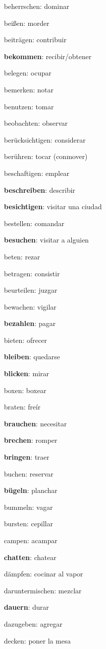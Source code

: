 \begin{multicols}{2}
\begin{myitemize}
\item beherrschen: dominar
\item beißen: morder
\item beiträgen: contribuir
\item \textbf{bekommen}: recibir/obtener
\item belegen: ocupar
\item bemerken: notar
\item benutzen: tomar
\item beobachten: observar
\item berücksichtigen: considerar
\item berühren: tocar (conmover)
\item beschaftigen: emplear
\item \textbf{beschreiben}: describir
\item \textbf{besichtigen}: visitar una ciudad
\item bestellen: comandar
\item \textbf{besuchen}: visitar a alguien
\item beten: rezar
\item betragen: consistir
\item beurteilen: juzgar
\item bewachen: vigilar
\item \textbf{bezahlen}: pagar
\item bieten: ofrecer
\item \textbf{bleiben}: quedarse
\item \textbf{blicken}: mirar
\item boxen: boxear
\item braten: freír
\item \textbf{brauchen}: necesitar
\item \textbf{brechen}: romper
\item \textbf{bringen}: traer
\item buchen: reservar
\item \textbf{bügeln}: planchar
\item bummeln: vagar
\item bursten: cepillar
\item campen: acampar
\item \textbf{chatten}: chatear
\item dämpfen: cocinar al vapor
\item daruntermischen: mezclar
\item \textbf{dauern}: durar
\item dazugeben: agregar
\item decken: poner la mesa

\end{myitemize}
\end{multicols}
